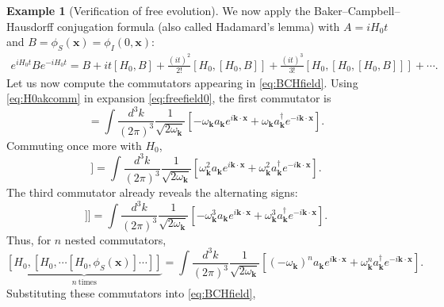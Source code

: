\documentclass[11pt,letterpaper]{article}
\theoremstyle{definition}
\theoremstyle{definition}
\newtheorem{ejemplo}{Example}
\begin{document}
\begin{ejemplo}[Verification of free evolution]
We now apply the Baker--Campbell--Hausdorff conjugation formula
(also called Hadamard's lemma) with
$A=iH_0t$ and $B=\phi_S(\mathbf{x})=\phi_I(0,\mathbf{x})$:
\begin{equation}
  \boxed{\begin{gathered}\textstyle
  e^{iH_0t}B e^{-iH_0t}
  =
  B+it[H_0,B]
  +\frac{(it)^2}{2!}[H_0,[H_0,B]]
  +\frac{(it)^3}{3!}[H_0,[H_0,[H_0,B]]]+\cdots .
  \end{gathered}}
  \label{eq:BCHfield}
\end{equation}
Let us now compute the commutators appearing in \eqref{eq:BCHfield}.
Using \eqref{eq:H0akcomm} in expansion \eqref{eq:freefield0}, the first
commutator is
\begin{equation}
  [H_0,\phi_S(\mathbf{x})]
  =
  \int\frac{d^3k}{(2\pi)^3}
  \frac{1}{\sqrt{2\omega_{\mathbf{k}}}}
  \left[
    -\omega_{\mathbf{k}}a_{\mathbf{k}}e^{i\mathbf{k}\cdot\mathbf{x}}
    +\omega_{\mathbf{k}}a_{\mathbf{k}}^\dagger e^{-i\mathbf{k}\cdot\mathbf{x}}
  \right].
  \label{eq:firstPhiComm}
\end{equation}
Commuting once more with \(H_0\),
\begin{equation}
  [H_0,[H_0,\phi_S(\mathbf{x})]]
  =
  \int\frac{d^3k}{(2\pi)^3}
  \frac{1}{\sqrt{2\omega_{\mathbf{k}}}}
  \left[
    \omega_{\mathbf{k}}^2a_{\mathbf{k}}e^{i\mathbf{k}\cdot\mathbf{x}}
    +\omega_{\mathbf{k}}^2a_{\mathbf{k}}^\dagger e^{-i\mathbf{k}\cdot\mathbf{x}}
  \right].
  \label{eq:secondPhiComm}
\end{equation}
The third commutator already reveals the alternating signs:
\begin{equation}
  [H_0,[H_0,[H_0,\phi_S(\mathbf{x})]]]
  =
  \int\frac{d^3k}{(2\pi)^3}
  \frac{1}{\sqrt{2\omega_{\mathbf{k}}}}
  \left[
    -\omega_{\mathbf{k}}^3a_{\mathbf{k}}e^{i\mathbf{k}\cdot\mathbf{x}}
    +\omega_{\mathbf{k}}^3a_{\mathbf{k}}^\dagger e^{-i\mathbf{k}\cdot\mathbf{x}}
  \right].
  \label{eq:thirdPhiComm}
\end{equation}
Thus, for \(n\) nested commutators,
\begin{equation}
  \underbrace{[H_0,[H_0,\cdots[H_0,\phi_S(\mathbf{x})]\cdots]]}_{n\ \text{times}}
  =
  \int\frac{d^3k}{(2\pi)^3}
  \frac{1}{\sqrt{2\omega_{\mathbf{k}}}}
  \left[
    (-\omega_{\mathbf{k}})^n
    a_{\mathbf{k}}e^{i\mathbf{k}\cdot\mathbf{x}}
    +\omega_{\mathbf{k}}^n
    a_{\mathbf{k}}^\dagger e^{-i\mathbf{k}\cdot\mathbf{x}}
  \right].
  \label{eq:nestedPhiComm}
\end{equation}
Substituting these commutators into \eqref{eq:BCHfield},

\end{ejemplo}
\end{document}
